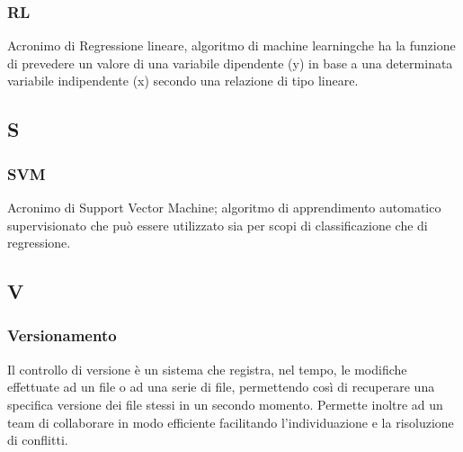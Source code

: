 \subsubsection*{RL}
Acronimo di Regressione lineare, algoritmo di machine learning\glosp che ha la funzione di prevedere un valore di una variabile dipendente (y) in base a una determinata variabile indipendente (x) secondo una relazione di tipo lineare.
\subsection*{S}
\subsubsection*{SVM}
Acronimo di Support Vector Machine; algoritmo di apprendimento automatico supervisionato che può essere utilizzato sia per scopi di classificazione che di regressione.

\subsection*{V}
\subsubsection*{Versionamento}
Il controllo di versione è un sistema che registra, nel tempo, le modifiche effettuate ad un file o ad una serie di file, permettendo così di recuperare una specifica versione dei file stessi in un secondo momento. Permette inoltre ad un team di collaborare in modo efficiente facilitando l'individuazione e la risoluzione di conflitti.

